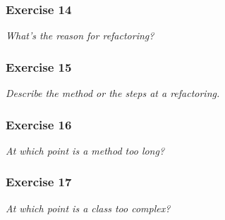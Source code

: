 \subsubsection*{Exercise 14}
\textit{What's the reason for refactoring?} \\

\subsubsection*{Exercise 15}
\textit{Describe the method or the steps at a refactoring.} \\

\subsubsection*{Exercise 16}
\textit{At which point is a method too long?} \\

\subsubsection*{Exercise 17}
\textit{At which point is a class too complex?} \\

